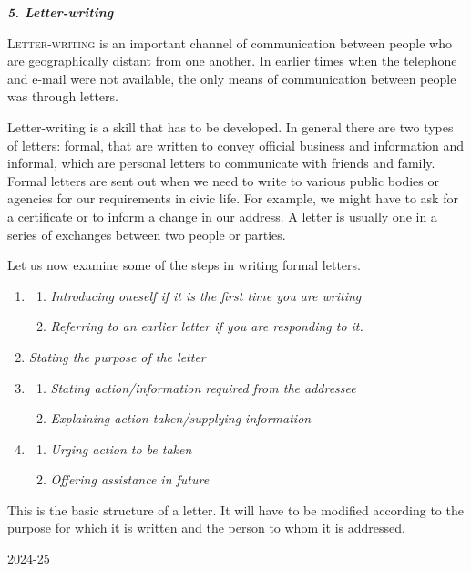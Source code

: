 \documentclass[11pt,a4paper]{article}
\begin{document}
\begin{center}
    {\Huge \bfseries \itshape \color{magenta} 5. Letter-writing}
\end{center}

\vspace{1.5em}

\noindent \textsc{Letter-writing} is an important channel of communication between people who are geographically distant from one another. In earlier times when the telephone and e-mail were not available, the only means of communication between people was through letters.

Letter-writing is a skill that has to be developed. In general there are two types of letters: formal, that are written to convey official business and information and informal, which are personal letters to communicate with friends and family. Formal letters are sent out when we need to write to various public bodies or agencies for our requirements in civic life. For example, we might have to ask for a certificate or to inform a change in our address. A letter is usually one in a series of exchanges between two people or parties.

\vspace{1.5em}


\vspace{0.8em}

\noindent Let us now examine some of the steps in writing formal letters.

\begin{enumerate}[label=\arabic*., leftmargin=*]
    \item \begin{enumerate}[label=(\i), leftmargin=1.5em, itemsep=0.1em]
        \item \textit{Introducing oneself if it is the first time you are writing}
        \item \textit{Referring to an earlier letter if you are responding to it.}
    \end{enumerate}
    \item \textit{Stating the purpose of the letter}
    \item \begin{enumerate}[label=(\i), leftmargin=1.5em, itemsep=0.1em]
        \item \textit{Stating action/information required from the addressee}
        \item \textit{Explaining action taken/supplying information}
    \end{enumerate}
    \item \begin{enumerate}[label=(\i), leftmargin=1.5em, itemsep=0.1em]
        \item \textit{Urging action to be taken}
        \item \textit{Offering assistance in future}
    \end{enumerate}
\end{enumerate}

\vspace{1em}

\noindent\hspace*{1.5em} This is the basic structure of a letter. It will have to be modified according to the purpose for which it is written and the person to whom it is addressed.

\vfill
\begin{center}
    \footnotesize 2024-25
\end{center}
\end{document}
